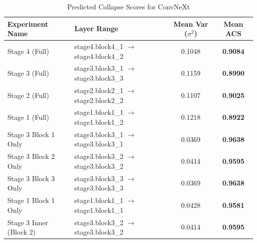 \begin{table}[h]
\caption{Predicted Collapse Scores for ConvNeXt}
\label{tab:acs_convnext}
\begin{tabular}{llcc}
\toprule
Experiment Name & Layer Range & Mean Var ($\sigma^2$) & Mean ACS \\
\midrule
Stage 4 (Full) & stage4.block4\_1 $\to$ stage4.block4\_2 & 0.1048 & \textbf{0.9084} \\
Stage 3 (Full) & stage3.block3\_1 $\to$ stage3.block3\_3 & 0.1159 & \textbf{0.8990} \\
Stage 2 (Full) & stage2.block2\_1 $\to$ stage2.block2\_2 & 0.1107 & \textbf{0.9025} \\
Stage 1 (Full) & stage1.block1\_1 $\to$ stage1.block1\_2 & 0.1218 & \textbf{0.8922} \\
Stage 3 Block 1 Only & stage3.block3\_1 $\to$ stage3.block3\_1 & 0.0369 & \textbf{0.9638} \\
Stage 3 Block 2 Only & stage3.block3\_2 $\to$ stage3.block3\_2 & 0.0414 & \textbf{0.9595} \\
Stage 3 Block 3 Only & stage3.block3\_3 $\to$ stage3.block3\_3 & 0.0369 & \textbf{0.9638} \\
Stage 1 Block 1 Only & stage1.block1\_1 $\to$ stage1.block1\_1 & 0.0428 & \textbf{0.9581} \\
Stage 3 Inner (Block 2) & stage3.block3\_2 $\to$ stage3.block3\_2 & 0.0414 & \textbf{0.9595} \\
\bottomrule
\end{tabular}
\end{table}
